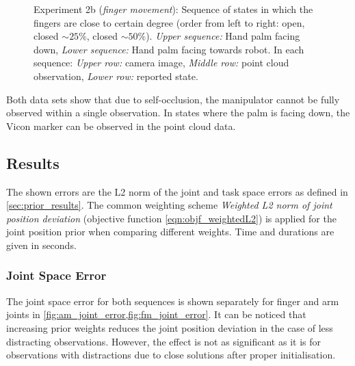 \begin{figure}
\begin{tabular}{cc:c:c}
\end{tabular}
\caption[Finger movement sequence]{Experiment 2b (\textit{finger movement}): Sequence of states in which the fingers are close to certain degree (order from left to right: open, closed $\sim 25\%$, closed $\sim 50\%$). \textit{Upper sequence:} Hand palm facing down, \textit{Lower sequence:} Hand palm facing towards robot. In each sequence: \textit{Upper row:} camera image, \textit{Middle row:} point cloud observation, \textit{Lower row:} reported state.}
\label{fig:finger_movement_states}
\end{figure}

Both data sets show that due to self-occlusion, the manipulator cannot be fully observed within a single observation. In states where the palm is facing down, the Vicon marker can be observed in the point cloud data.



\subsection{Results}

The shown errors are the L2 norm of the joint and task space errors as defined in \cref{sec:prior_results}. The common weighting scheme \emph{Weighted L2 norm of joint position deviation} (objective function \cref{eqn:objf_weightedL2}) is applied for the joint position prior when comparing different weights. Time and durations are given in seconds.

\subsubsection{Joint Space Error}

The joint space error for both sequences is shown separately for finger and arm joints in \cref{fig:am_joint_error,fig:fm_joint_error}. It can be noticed that increasing prior weights reduces the joint position deviation in the case of less distracting observations. However, the effect is not as significant as it is for observations with distractions due to close solutions after proper initialisation.

